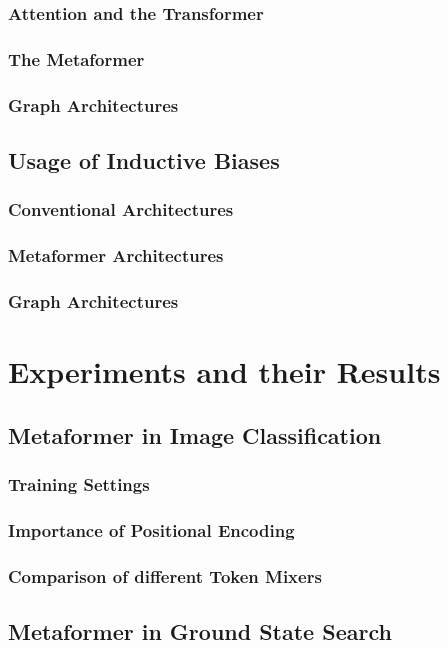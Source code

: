 \documentclass[
headings=optiontohead,              %
12pt,                               %
DIV=13,                             %
twoside=false,                      %
open=right,                         %
BCOR=10mm,                          %
toc=bibliographynumbered            %
]{scrreport}
\begin{document}
        \subsection{Attention and the Transformer}
        \subsection{The Metaformer}
        \subsection{Graph Architectures}
    \section{Usage of Inductive Biases}
        \subsection{Conventional Architectures}
        \subsection{Metaformer Architectures}
        \subsection{Graph Architectures}

\chapter{Experiments and their Results}
    \section{Metaformer in Image Classification}
        \subsection{Training Settings}
        \subsection{Importance of Positional Encoding}
        \subsection{Comparison of different Token Mixers}

    \section{Metaformer in Ground State Search}
\end{document}
